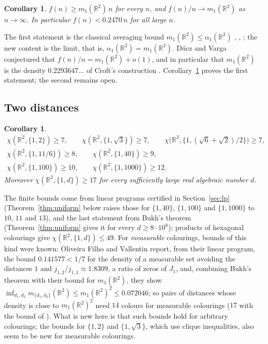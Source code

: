 \documentclass[11pt,a4paper]{amsart}
\newtheorem{corollary}[theorem]{Corollary}
\theoremstyle{definition}
\theoremstyle{remark}
\newcommand{\R}{\mathbb{R}}
\begin{document}
\begin{corollary}\label{cor:ratio}
$f(n)\ge m_1(\R^2)\,n$ for every $n$, and $f(n)/n\to m_1(\R^2)$ as $n\to\infty$. In particular $f(n)<0.2470\,n$ for
all large $n$.
\end{corollary}

The first statement is the classical averaging bound $m_1(\R^2)\le\alpha_1(\R^2)$ \cite[Remark after
Cor.~2]{ACMVZ}, \cite[(14)]{MRVZ}, \cite[Claim~1]{DV}; the new content is the limit, that is,
$\alpha_1(\R^2)=m_1(\R^2)$. Dúcz and Varga conjectured that $f(n)/n=m_1(\R^2)+o(1)$, and in particular that
$m_1(\R^2)$ is the density
$0.2293647\ldots$ of Croft's construction \cite[Conj.~1]{DV}. Corollary~\ref{cor:ratio} proves the first statement;
the second remains open.

\subsection*{Two distances}

\begin{corollary}\label{cor:two}
\begin{gather*}
\chi(\R^2,\{1,2\})\ge 7,\qquad \chi(\R^2,\{1,\sqrt3\})\ge 7,\qquad
\chi\bigl(\R^2,\{1,(\sqrt6+\sqrt2)/2\}\bigr)\ge 7,\\
\chi(\R^2,\{1,11/6\})\ge 8,\qquad \chi(\R^2,\{1,40\})\ge 9,\\
\chi(\R^2,\{1,100\})\ge 10,\qquad \chi(\R^2,\{1,1000\})\ge 12.
\end{gather*}
Moreover $\chi(\R^2,\{1,d\})\ge 17$ for every sufficiently large real algebraic number $d$.
\end{corollary}

The finite bounds come from linear programs certified in Section~\ref{sec:lp} (Theorem~\ref{thm:uniform} below
raises those for $\{1,40\}$, $\{1,100\}$ and $\{1,1000\}$ to $10$, $11$ and $13$), and the last statement from Bukh's
theorem \cite{Bukh} (Theorem~\ref{thm:uniform} gives it for every $d\ge8\cdot10^8$); products of hexagonal colourings give $\chi(\R^2,\{1,d\})\le49$. For \emph{measurable}
colourings, bounds of this kind were known: Oliveira Filho and Vallentin \cite[§4]{OFV} report, from their linear
program, the bound $0.141577<1/7$ for the density of a measurable set avoiding the distances $1$ and
$j_{1,2}/j_{1,1}\approx1.8309$, a ratio of zeros of $J_1$, and, combining Bukh's theorem with their bound for
$m_1(\R^2)$, they show $\inf_{d_1,d_2}m_{\{d_1,d_2\}}(\R^2)\le m_1(\R^2)^2\le0.072046$; so pairs of distances whose
density is close to $m_1(\R^2)^2$ need $14$ colours for measurable colourings ($17$ with the bound of
\cite{ACMVZ}). What is new here is that such bounds hold for arbitrary colourings; the bounds for $\{1,2\}$ and
$\{1,\sqrt3\}$, which use clique inequalities, also seem to be new for measurable colourings.
\end{document}
